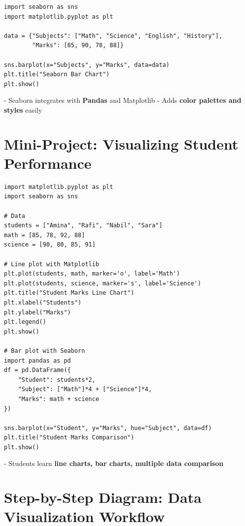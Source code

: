 \begin{verbatim}
import seaborn as sns
import matplotlib.pyplot as plt

data = {"Subjects": ["Math", "Science", "English", "History"],
        "Marks": [85, 90, 78, 88]}

sns.barplot(x="Subjects", y="Marks", data=data)
plt.title("Seaborn Bar Chart")
plt.show()
\end{verbatim}

- Seaborn integrates with \textbf{Pandas} and Matplotlib  
- Adds \textbf{color palettes and styles} easily  

\section{Mini-Project: Visualizing Student Performance}

\begin{verbatim}
import matplotlib.pyplot as plt
import seaborn as sns

# Data
students = ["Amina", "Rafi", "Nabil", "Sara"]
math = [85, 78, 92, 88]
science = [90, 80, 85, 91]

# Line plot with Matplotlib
plt.plot(students, math, marker='o', label='Math')
plt.plot(students, science, marker='s', label='Science')
plt.title("Student Marks Line Chart")
plt.xlabel("Students")
plt.ylabel("Marks")
plt.legend()
plt.show()

# Bar plot with Seaborn
import pandas as pd
df = pd.DataFrame({
    "Student": students*2,
    "Subject": ["Math"]*4 + ["Science"]*4,
    "Marks": math + science
})

sns.barplot(x="Student", y="Marks", hue="Subject", data=df)
plt.title("Student Marks Comparison")
plt.show()
\end{verbatim}

- Students learn \textbf{line charts, bar charts, multiple data comparison}  

\section{Step-by-Step Diagram: Data Visualization Workflow}

\begin{center}
\end{center}

